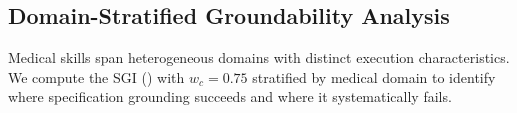 \begin{table}[t]
\centering\small
\caption{Two-stage decomposition of the \rbu gap by \texttt{tool\_type}. $\delta_{\text{sem}}$: semantic grounding gap (specification $\to$ action). $\delta_{\text{exec}}$: execution completion gap (action $\to$ outcome).}
\setlength{\tabcolsep}{3pt}
\label{tab:decomposition}
\end{table}


\subsection{Domain-Stratified Groundability Analysis}
\label{ssec:domain_analysis}

Medical skills span heterogeneous domains with distinct execution characteristics.
We compute the \textsc{SGI} () with $w_c = 0.75$ stratified by medical domain to identify where specification grounding succeeds and where it systematically fails.

